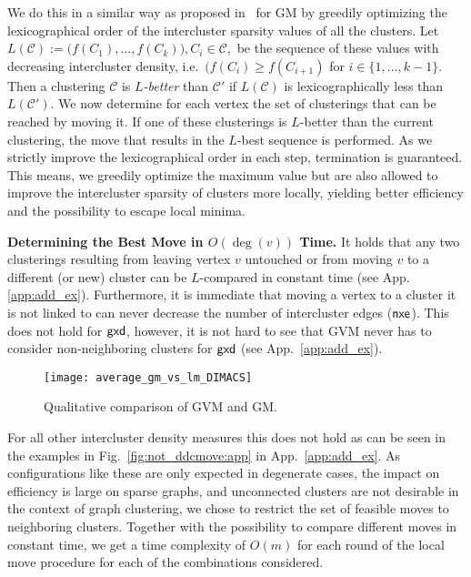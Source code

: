 \documentclass{llncs}
\newcommand{\measure}[1]{\ensuremath{\text{\normalfont{\sffamily {#1}}}}\xspace}
\newcommand{\C}{\ensuremath{\mathcal{C}}}
\newcommand{\andreapar}{\vspace*{.5ex}\par\noindent}
\begin{document}
We do this in a similar way as proposed in~\cite{gsw-dcgc-11b} for GM by greedily optimizing the lexicographical order of the intercluster sparsity values of all the clusters.
Let $L(\C) := \bigl(f(C_1), \ldots, f(C_k)\bigr), C_i \in \C,$ be the sequence of these values with decreasing intercluster density, i.e.~$(f(C_i) \geq f(C_{i+1})$ for $i \in \{1, \ldots, k-1\}$.
Then a clustering $\C$ is \emph{$L$-better} than $\C'$ if $L(\C)$ is lexicographically less than $L(\C')$.
We now determine for each vertex the set of clusterings that can be reached by moving it. 
If one of these clusterings is $L$-better than the current clustering,
the move that results in the $L$-best sequence is performed.
As we strictly improve the lexicographical order in each step, termination is guaranteed.
This means, we greedily optimize the maximum value but are also allowed to improve the intercluster sparsity of clusters more locally, yielding better efficiency and the possibility to escape local minima.
\andreapar\textbf{Determining the Best Move in $O(\deg(v))$ Time.}
It holds that any two clusterings resulting from leaving vertex $v$ untouched or from moving $v$ to a different (or new) cluster can be $L$-compared in constant time (see App. \ref{app:add_ex}).
Furthermore, it is immediate that moving a vertex to a cluster it is not linked to can never decrease the number of intercluster edges (\measure{nxe}).
This does not hold for \measure{gxd}, however, it is not hard to see that GVM never has to consider non-neighboring clusters for \measure{gxd} (see App.~\ref{app:add_ex}).
\begin{figure}
 	\centerline{\texttt{[image: average\_gm\_vs\_lm\_DIMACS]}}
	\vspace{-1.5ex}
 	\caption{Qualitative comparison of GVM and GM.}
 	\label{fig:LM_vs_MOVE}
\end{figure}
For all other intercluster density measures this does not hold as can be seen in the examples in Fig.~\ref{fig:not_ddcmove:app} in App.~\ref{app:add_ex}. As configurations like these are only expected in degenerate cases, the impact on efficiency is large on sparse graphs, and unconnected clusters are not desirable in the context of graph clustering, we chose to restrict the set of feasible moves to neighboring clusters.
Together with the possibility to compare different moves in constant time, we get a time complexity of $O(m)$ for each round of the local move procedure for each of the combinations considered.
\end{document}
